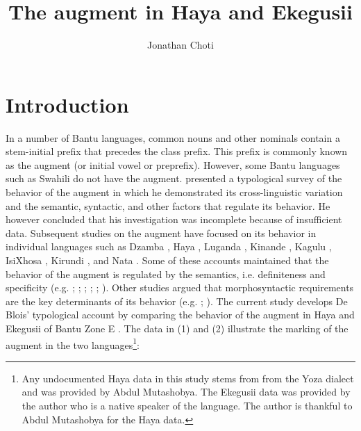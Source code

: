 \documentclass[output=paper]{langscibook}
\author{Jonathan Choti\affiliation{Michigan State University}}
\title{The augment in Haya and Ekegusii}
\begin{document}
\maketitle

\section{Introduction}
In a number of Bantu languages, common nouns and other nominals contain a stem-initial prefix that precedes the class prefix. This prefix is commonly known as the augment (or initial vowel or preprefix). However, some Bantu languages such as Swahili do not have the augment. \cite{blois1970augment} presented a typological survey of the behavior of the augment in which he demonstrated its cross-linguistic variation and the semantic, syntactic, and other factors that regulate its behavior. He however concluded that his investigation was incomplete because of insufficient data. Subsequent studies on the augment have focused on its behavior in individual languages such as Dzamba \citep{bokamba1971specificity}, Haya \citep{chagas1977}, Luganda  \citep{ashton1987luganda,hyman1993augment,ferrari2009,mould1974syntax}, Kinande \citep{progovac1993non}, Kagulu \citep{petzell2003function}, IsiXhosa \citep{visser2008definiteness}, Kirundi \citep{ndayiragije2012augment}, and Nata \citep{gambarage2013pre,gambarage2019belief}. Some of these accounts maintained that the behavior of the augment is regulated by the semantics, i.e. definiteness and specificity (e.g. \cite{bleek1869comparative}; \cite{bokamba1971specificity}; \cite{gambarage2013pre,gambarage2019belief}; \cite{givon1972studies}; \cite{meeussen1959essai}; \cite{mould1974syntax}). Other studies argued that morphosyntactic requirements are the key determinants of its behavior (e.g. \cite{dewees1971role}; \cite{hyman1993augment}). The current study develops De Blois’ typological account by comparing the behavior of the augment in Haya and Ekegusii of Bantu Zone E \citep{guthrie196771}. The data in (1) and (2) illustrate the marking of the augment in the two languages\footnote{Any undocumented Haya data in this study stems from from the Yoza dialect and was provided by Abdul Mutashobya. The Ekegusii data was provided by the author who is a native speaker of the language. The author is thankful to Abdul Mutashobya for the Haya data.}:
\end{document}
